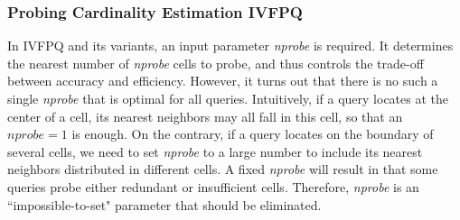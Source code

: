 \documentclass[11pt]{article}
\begin{document}
%

\subsubsection{Probing Cardinality Estimation IVFPQ}
In IVFPQ and its variants, an input parameter \textit{nprobe} is required. It determines the nearest number of \textit{nprobe} cells to probe, and thus controls the trade-off between accuracy and efficiency. However, it turns out that there is no such a single \textit{nprobe} that is optimal for all queries. Intuitively, if a query locates at the center of a cell, its nearest neighbors may all fall in this cell, so that an $\textit{nprobe}=1$ is enough. On the contrary, if a query locates on the boundary of several cells, we need to set \textit{nprobe} to a large number to include its nearest neighbors distributed in different cells. A fixed \textit{nprobe} will result in that some queries probe either redundant or insufficient cells. Therefore, \textit{nprobe} is an ``impossible-to-set" parameter that should be eliminated.
\end{document}
